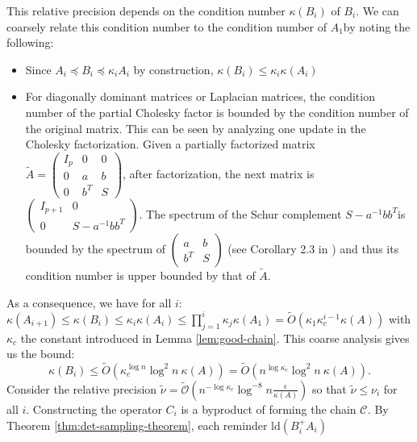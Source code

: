 This relative precision depends on the condition number $\kappa\left(B_{i}\right)$
of $B_{i}$. We can coarsely relate this condition number to the condition
number of $A_{1}$by noting the following:
\begin{itemize}
\item Since $A_{i}\preceq B_{i}\preceq\kappa_{i}A_{i}$ by construction,
$\kappa\left(B_{i}\right)\leq\kappa_{i}\kappa\left(A_{i}\right)$
\item For diagonally dominant matrices or Laplacian matrices, the condition
number of the partial Cholesky factor is bounded by the condition
number of the original matrix. This can be seen by analyzing one update
in the Cholesky factorization. Given a partially factorized matrix
$\tilde{A}=\left(\begin{array}{ccc}
I_{p} & 0 &0\\
0 & a & b\\
0 & b^{T} & S
\end{array}\right)$, after factorization, the next matrix is $\left(\begin{array}{cc}
I_{p+1} & 0\\
0 & S-a^{-1}bb^{T}
\end{array}\right)$. The spectrum of the Schur complement $S-a^{-1}bb^{T}$is bounded
by the spectrum of $\left(\begin{array}{cc}
a & b\\
b^{T} & S
\end{array}\right)$ (see Corollary 2.3 in \cite{Zhang2005}) and thus its condition number
is upper bounded by that of $\tilde{A}$.
\end{itemize}
As a consequence, we have for all $i$: $\kappa\left(A_{i+1}\right)\leq\kappa\left(B_{i}\right)\leq\kappa_{i}\kappa\left(A_{i}\right)\leq\prod_{j=1}^{i}\kappa_{j}\kappa\left(A_{1}\right) =\tilde{O} \left(\kappa_1\kappa_{c}^{i-1}\kappa\left(A\right)\right)$ with $\kappa_c$ the constant introduced in Lemma \ref{lem:good-chain}. This coarse analysis gives us the bound:
\[
\kappa\left(B_{i}\right)\leq\tilde{O}\left(\kappa_{c}^{\log n}\log^{2}n ~ \kappa\left(A\right)\right)=\tilde{O}\left(n^{\log\kappa_{c}}\log^{2}n \ \kappa\left(A\right)\right).
\] Consider the relative precision
$\tilde{\nu}=\tilde{\mathcal{O}}\left(n^{-\log\kappa_{c}}\log^{-8}n\frac{\epsilon}{\kappa\left(A\right)}\right)$
so that $\tilde{\nu}\leq\nu_{i}$ for all $i$. Constructing the operator
$C_{i}$ is a byproduct of forming the chain \emph{$\mathcal{C}$.
}By Theorem \ref{thm:det-sampling-theorem}, each reminder $\text{ld}\left(B_{i}^{+}A_{i}\right)$
